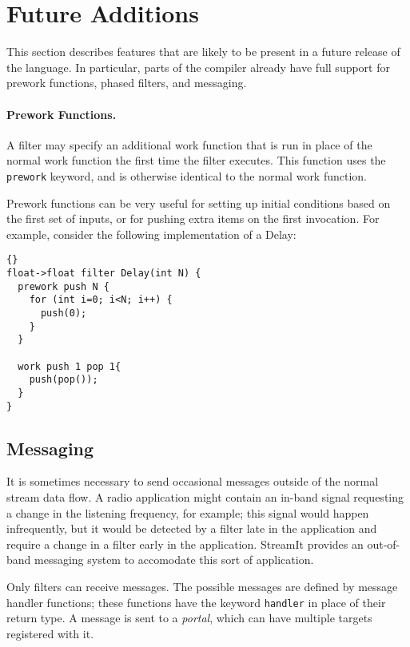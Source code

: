 \documentclass[11pt]{article}
\begin{document}
\section{Future Additions}

This section describes features that are likely to be present in a
future release of the language.  In particular, parts of the compiler
already have full support for prework functions, phased filters, and
messaging.

\paragraph{Prework Functions.}  A filter may specify an additional work 
function that is run in place of the normal work function the first
time the filter executes.  This function uses the \lstinline|prework|
keyword, and is otherwise identical to the normal work function.

Prework functions can be very useful for setting up initial conditions
based on the first set of inputs, or for pushing extra items on the
first invocation.  For example, consider the following implementation
of a Delay:

\begin{lstlisting}{}
float->float filter Delay(int N) {
  prework push N {
    for (int i=0; i<N; i++) {
      push(0);
    }
  }

  work push 1 pop 1{
    push(pop());
  }
}
\end{lstlisting}

\subsection{Messaging}
\label{sec:messaging}

It is sometimes necessary to send occasional messages outside of the
normal stream data flow.  A radio application might contain an in-band
signal requesting a change in the listening frequency, for example;
this signal would happen infrequently, but it would be detected by a
filter late in the application and require a change in a filter early
in the application.  StreamIt provides an out-of-band messaging system
to accomodate this sort of application.

Only filters can receive messages.  The possible messages are defined
by message handler functions; these functions have the keyword
\lstinline|handler| in place of their return type.  A message is sent
to a \emph{portal}, which can have multiple targets registered with
it.
\end{document}
